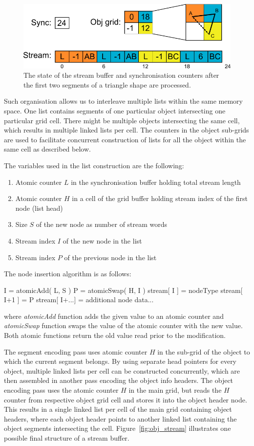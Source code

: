 \documentclass[11pt,a4paper,twoside]{article}
\begin{document}
\begin {figure}
	\centering
	\includegraphics[width=0.6\columnwidth] {figures/cell_stream}
	\caption {The state of the stream buffer and synchronisation counters after the first two segments of a triangle shape are processed.}
	\label {fig:cell_stream}
\end {figure}

Such organisation allows us to interleave multiple lists within the same memory space. One list contains segments of one particular object intersecting one particular grid cell. There might be multiple objects intersecting the same cell, which results in multiple linked lists per cell. The counters in the object sub-grids are used to facilitate concurrent construction of lists for all the object within the same cell as described below.

The variables used in the list construction are the following:

\begin {enumerate}
\item
Atomic counter $L$ in the synchronisation buffer holding total stream length
\item
Atomic counter $H$ in a cell of the grid buffer holding stream index of the first node (list head)
\item
Size $S$ of the new node as number of stream words
\item
Stream index $I$ of the new node in the list
\item
Stream index $P$ of the previous node in the list
\end {enumerate}

The node insertion algorithm is as follows:
\begin{verbatimtab}[3]
	I = atomicAdd( L, S )
	P = atomicSwap( H, I )
	stream[ I ] = nodeType
	stream[ I+1 ] = P
	stream[ I+...] = additional node data...
\end{verbatimtab}
where \emph{atomicAdd} function adds the given value to an atomic counter and \emph{atomicSwap} function swaps the value of the atomic counter with the new value. Both atomic functions return the old value read prior to the modification.

The segment encoding pass uses atomic counter $H$ in the sub-grid of the object to which the current segment belongs. By using separate head pointers for every object, multiple linked lists per cell can be constructed concurrently, which are then assembled in another pass encoding the object info headers. The object encoding pass uses the atomic counter $H$ in the main grid, but reads the $H$ counter from respective object grid cell and stores it into the object header node. This results in a single linked list per cell of the main grid containing object headers, where each object header points to another linked list containing the object segments intersecting the cell. Figure~\ref{fig:obj_stream} illustrates one possible final structure of a stream buffer.
\end{document}

